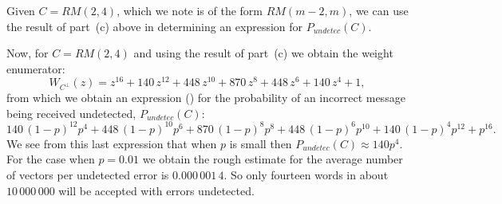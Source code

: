 Given $C=RM(2,4)$, which we note is of the form $RM(m-2,m)$, we can use the result of part~(c) above in determining an expression for $P_{undetec}(C)$.

Now, for $C=RM(2,4)$ and using the result of part~(c) we obtain the weight enumerator:
\[
W_{C^\perp}(z) = z^{16} + 140 \, z^{12} + 448 \, z^{10} + 870 \, z^{8} + 448 \, z^{6} + 140 \, z^{4} + 1,
\]
from which we obtain an expression () for the probability of an incorrect message being received undetected, $P_{undetec}(C)$:
\[
140 \, {\left(1-p\right)}^{12} p^{4} + 448 \, {\left(1-p\right)}^{10} p^{6} + 870 \, {\left(1-p\right)}^{8} p^{8} + 448 \, {\left(1-p\right)}^{6} p^{10} + 140 \, {\left(1-p\right)}^{4} p^{12} + p^{16}.
\]
We see from this last expression that when $p$ is small then $P_{undetec}(C)\approx 140p^4$. For the case when $p=0.01$ we obtain the rough estimate for the average number of vectors per undetected error is $0.000\,001\,4$. So only fourteen words in about $10\,000\,000$ will be accepted with errors undetected.
